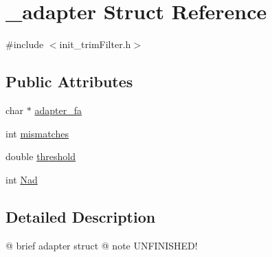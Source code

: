 \hypertarget{struct__adapter}{\section{\+\_\+adapter Struct Reference}
\label{struct__adapter}
}


{\ttfamily \#include $<$init\+\_\+trim\+Filter.\+h$>$}

\subsection*{Public Attributes}
\begin{DoxyCompactItemize}
\item 
char $\ast$ \hyperlink{struct__adapter_a8cce15db14580af09438241b8b5e0378}{adapter\+\_\+fa}
\item 
int \hyperlink{struct__adapter_a51c6998b13837c66f79b3a1dd3c11995}{mismatches}
\item 
double \hyperlink{struct__adapter_a2d1273cfaa0d51c79f331b92ed2342b4}{threshold}
\item 
int \hyperlink{struct__adapter_aed006c3b66849e781049076b11f297d3}{Nad}
\end{DoxyCompactItemize}


\subsection{Detailed Description}
@ brief adapter struct @ note U\+N\+F\+I\+N\+I\+S\+H\+E\+D! 

